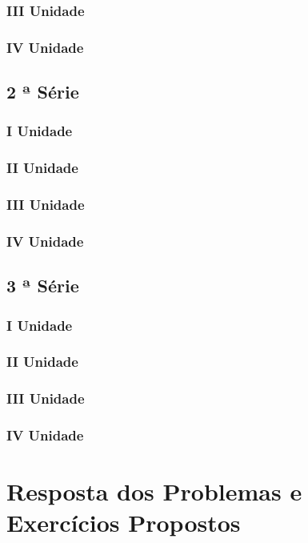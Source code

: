 \documentclass[12pt,a4paper]{book}
\begin{document}
		\subsection{III Unidade}
		\subsection{IV Unidade}
	
	\section{2 ª Série}
		\subsection{I Unidade}
		\subsection{II Unidade}
		\subsection{III Unidade}
		\subsection{IV Unidade}
		
	\section{3 ª Série}
		\subsection{I Unidade}
		\subsection{II Unidade}
		\subsection{III Unidade}
		\subsection{IV Unidade}
	

\chapter{Resposta dos Problemas e Exercícios Propostos}
\end{document}
